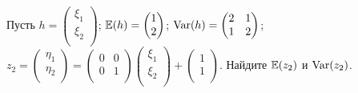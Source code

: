 \begin{problem}
Пусть $h =  \begin{pmatrix}
\xi_1 \\
\xi_2 \\
\end{pmatrix} $; $\mathbb{E} (h) =  \begin{pmatrix}
1\\
2\\
\end{pmatrix} $; $\operatorname{Var} (h) =  \begin{pmatrix}
2 & 1 \\
1 & 2 \\
\end{pmatrix} $; $z_2 =  \begin{pmatrix}
\eta_1 \\
\eta_2 \\
\end{pmatrix}  =  \begin{pmatrix}
0 & 0 \\
0 & 1 \\
\end{pmatrix}   \begin{pmatrix}
\xi_1 \\
\xi_2 \\
\end{pmatrix}  +  \begin{pmatrix}
1\\
1\\
\end{pmatrix} $. Найдите $\mathbb{E} (z_2)$ и $\operatorname{Var} (z_2)$.



\end{problem}
